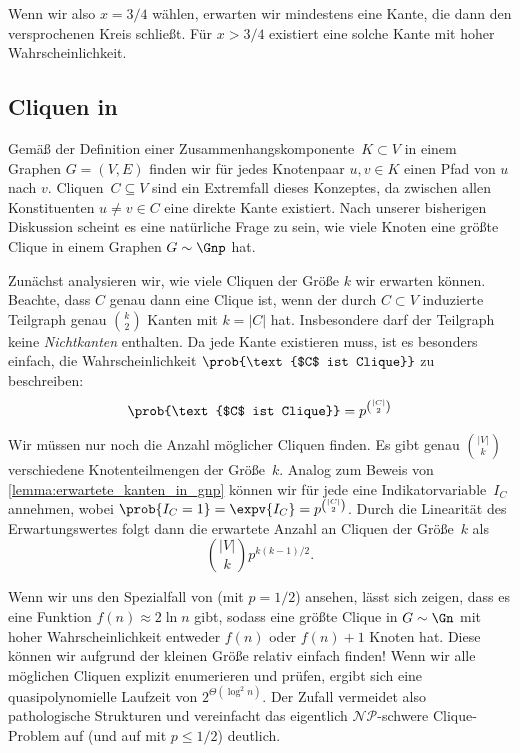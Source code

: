 Wenn wir also $x = 3/4$ wählen, erwarten wir mindestens eine Kante, die dann den versprochenen Kreis schließt.
Für $x > 3/4$ existiert eine solche Kante mit hoher Wahrscheinlichkeit.

\subsection{Cliquen in \Gnp}
Gemäß der Definition einer Zusammenhangskomponente~$K \subset V$ in einem Graphen $G=(V,E)$ finden wir für jedes Knotenpaar $u, v \in K$ einen Pfad von $u$ nach $v$.
Cliquen~$C \subseteq V$ sind ein Extremfall dieses Konzeptes, da zwischen allen Konstituenten $u \ne v \in C$ eine direkte Kante existiert.
Nach unserer bisherigen Diskussion scheint es eine natürliche Frage zu sein, wie viele Knoten eine größte Clique in einem Graphen $G \sim \Gnp$ hat.

Zunächst analysieren wir, wie viele Cliquen der Größe $k$ wir erwarten können.
Beachte, dass $C$ genau dann eine Clique ist, wenn der durch $C \subset V$ induzierte Teilgraph genau $\binom{k}{2}$ Kanten mit $k = |C|$ hat.
Insbesondere darf der Teilgraph keine \emph{Nichtkanten} enthalten.
Da jede Kante existieren muss, ist es besonders einfach, die Wahrscheinlichkeit $\prob{\text{$C$ ist Clique}}$ zu beschreiben:
\begin{equation}
    \prob{\text{$C$ ist Clique}} = p^{\binom{|C|}{2}}
\end{equation}

Wir müssen nur noch die Anzahl möglicher Cliquen finden.
Es gibt genau $\binom{|V|}{k}$ verschiedene Knotenteilmengen der Größe~$k$.
Analog zum Beweis von \cref{lemma:erwartete_kanten_in_gnp} können wir für jede eine Indikatorvariable~$I_C$ annehmen, wobei $\prob{I_C = 1} = \expv{I_C} = p^{\smash{\binom{|C|}{2}}}$.
Durch die Linearität des Erwartungswertes folgt dann die erwartete Anzahl an Cliquen der Größe~$k$ als
\begin{equation}
    \binom{|V|}{k} p^{k(k-1)/2}.
\end{equation}

Wenn wir uns den Spezialfall von \Gn (\dh \Gnp mit $p = 1/2$) ansehen, lässt sich zeigen, dass es eine Funktion $f(n) \approx 2\ln n$ gibt,
sodass eine größte Clique in $G \sim \Gn$ mit hoher Wahrscheinlichkeit entweder $f(n)$ oder $f(n)+1$ Knoten hat.
Diese können wir aufgrund der kleinen Größe relativ einfach finden!
Wenn wir alle möglichen Cliquen explizit enumerieren und prüfen, ergibt sich  eine quasipolynomielle Laufzeit von $2^{\Theta(\log^2 n)}$.
Der Zufall vermeidet also pathologische Strukturen und vereinfacht das eigentlich $\mathcal{NP}$-schwere Clique-Problem auf \Gn (und auf \Gnp mit $p \le 1/2$) deutlich.
